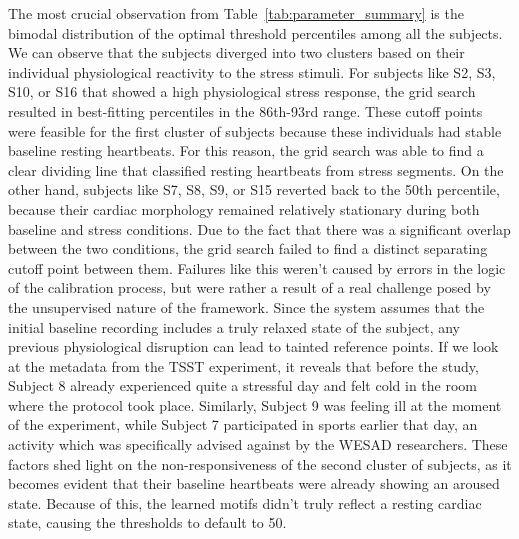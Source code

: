 \documentclass[conference,10pt]{IEEEtran}
\begin{document}
The most crucial observation from Table~\ref{tab:parameter_summary} is the bimodal distribution of the optimal threshold percentiles among all the subjects. We can observe that the subjects diverged into two clusters based on their individual physiological reactivity to the stress stimuli. For subjects like S2, S3, S10, or S16 that showed a high physiological stress response, the grid search resulted in best-fitting percentiles in the 86th-93rd range. These cutoff points were feasible for the first cluster of subjects because these individuals had stable baseline resting heartbeats. For this reason, the grid search was able to find a clear dividing line that classified resting heartbeats from stress segments. 
On the other hand, subjects like S7, S8, S9, or S15 reverted back to the 50th percentile, because their cardiac morphology remained relatively stationary during both baseline and stress conditions. Due to the fact that there was a significant overlap between the two conditions, the grid search failed to find a distinct separating cutoff point between them. 
Failures like this weren’t caused by errors in the logic of the calibration process, but were rather a result of a real challenge posed by the unsupervised nature of the framework. Since the system assumes that the initial baseline recording includes a truly relaxed state of the subject, any previous physiological disruption can lead to tainted reference points. 
If we look at the metadata from the TSST experiment, it reveals that before the study, Subject 8 already experienced quite a stressful day and felt cold in the room where the protocol took place. Similarly, Subject 9 was feeling ill at the moment of the experiment, while Subject 7 participated in sports earlier that day, an activity which was specifically advised against by the WESAD researchers. These factors shed light on the non-responsiveness of the second cluster of subjects, as it becomes evident that their baseline heartbeats were already showing an aroused state. Because of this, the learned motifs didn’t truly reflect a resting cardiac state, causing the thresholds to default to 50.
\end{document}
